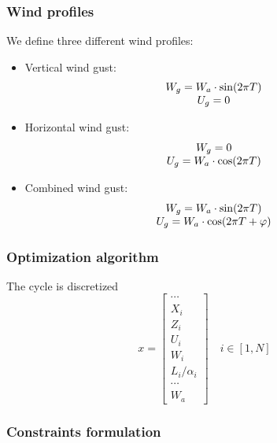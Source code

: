 \documentclass[compress]{beamer}
\begin{document}
\begin{frame}
  \frametitle{Wind profiles}
  We define three different wind profiles:
  \begin{itemize}
    \item Vertical wind gust:
      \begin{equation*}
	\begin{array}[c]{c}
	  W_g = W_a \cdot \sin(2\pi T) \\
	  U_g = 0 
	\end{array}
      \end{equation*}
    \item Horizontal wind gust:
      \begin{equation*}
	\begin{array}[c]{c}
	  W_g =0 \\ 
	  U_g = W_a \cdot \cos(2\pi T) 
	\end{array}
      \end{equation*}
    \item Combined wind gust:
      \begin{equation*}
	\begin{array}[c]{c}
	  W_g = W_a \cdot \sin(2\pi T) \\ 
	  U_g = W_a \cdot \cos(2 \pi T + \varphi)
	\end{array}
      \end{equation*}
  \end{itemize}
\end{frame}

\begin{frame}
  \frametitle{Optimization algorithm}
  The cycle is discretized 
  \begin{equation*}
    x= 
    \begin{bmatrix}
      \cdots \\
      X_i \\
      Z_i \\
      U_i \\
      W_i \\
      L_i / \alpha_i \\
      \cdots \\
      W_a
    \end{bmatrix}
    \quad i \in [1,N]
  \end{equation*}

\end{frame}

\begin{frame}
  \frametitle{Constraints formulation}

\end{frame}
\end{document}
